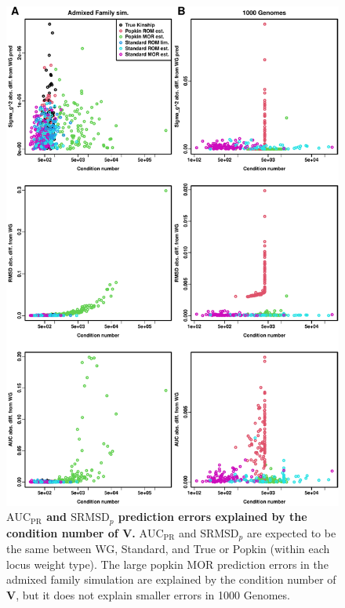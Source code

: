 \documentclass[11pt]{article}
\newcommand{\rmsd}{\text{SRMSD}_p}
\newcommand{\auc}{\text{AUC}_\text{PR}}
\begin{document}
\begin{figure}[bp!]
  \centering
  \includegraphics[height=0.9\textheight]{kappa-vs-pred-err.pdf}
  \caption{
    {\bf $\auc$ and $\rmsd$ prediction errors explained by the condition number of $\mathbf{V}$.}
    $\auc$ and $\rmsd$ are expected to be the same between WG, Standard, and True or Popkin (within each locus weight type).
    The large popkin MOR prediction errors in the admixed family simulation are explained by the condition number of $\mathbf{V}$, but it does not explain smaller errors in 1000 Genomes.
  }
  \label{fig:kappa-vs-pred-err}
\end{figure}
\end{document}
